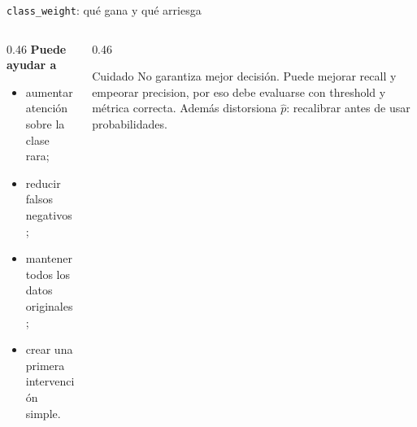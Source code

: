 \documentclass[aspectratio=169,12pt]{beamer}
\newcommand{\colhead}[1]{\textbf{#1}\par\vspace{2pt}}
\begin{document}
\begin{frame}{\texttt{class\_weight}: qué gana y qué arriesga}
  \begin{columns}[T]
    \begin{column}{0.46\textwidth}
      \colhead{Puede ayudar a}
      \begin{itemize}
        \item aumentar atención sobre la clase rara;
        \item reducir falsos negativos;
        \item mantener todos los datos originales;
        \item crear una primera intervención simple.
      \end{itemize}
    \end{column}
    \begin{column}{0.46\textwidth}
      \begin{alertblock}{Cuidado}
        No garantiza mejor decisión. Puede mejorar recall y empeorar precision, por eso debe evaluarse con threshold y métrica correcta. Además distorsiona $\hat{p}$: recalibrar antes de usar probabilidades.
      \end{alertblock}
    \end{column}
  \end{columns}
\end{frame}
\end{document}
